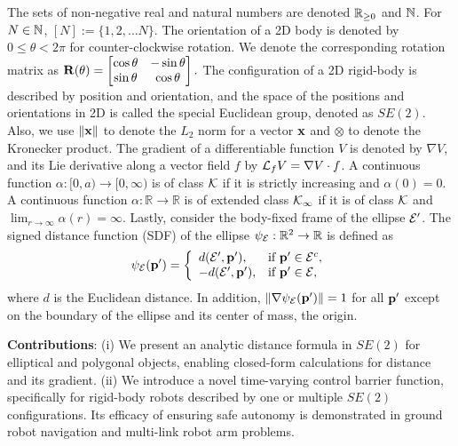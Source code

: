 The sets of non-negative real and natural numbers are denoted $\mathbb{R}_{\geq 0}$ and $\mathbb{N}$. For $N \in \mathbb{N}$, $[N] := \{1,2, \dots N\}$. The orientation of a 2D body is denoted by $0 \leq \theta < 2\pi$ for counter-clockwise rotation. We denote the corresponding rotation matrix as 
    $\mathbf{R}(\theta) = \begin{bmatrix} \cos \theta & -\sin \theta \\ \sin \theta & \cos \theta \end{bmatrix}.$
The configuration of a 2D rigid-body is described by position and orientation, and the space of the positions and orientations in 2D is called the special Euclidean group, denoted as $SE(2)$. Also, we use $\|\mathbf{x}\|$ to denote the $L_2$ norm for a vector $\mathbf{x}$ and $\otimes$ to denote the Kronecker product. The gradient of a differentiable function $V$ is denoted by $\nabla V$, and its Lie derivative along a vector field $f$ by ${\cal L}_f V  = \nabla V \cdot f$. A continuous function $\alpha: [0,a)\rightarrow [0,\infty )$ is of class ${\cal K}$ if it is strictly increasing and $\alpha(0) = 0$. A continuous function $\alpha:\mathbb{R} \rightarrow \mathbb{R}$ is of extended class ${\cal K}_{\infty}$ if it is of class ${\cal K}$ and $\lim_{r \rightarrow \infty} \alpha(r) = \infty$. Lastly, consider the body-fixed frame of the ellipse ${\cal E}'$. The signed distance function (SDF) of the ellipse $\psi_{\cal E}: \mathbb{R}^2 \to \mathbb{R}$ is defined as 
\begin{equation}
    \psi_{\cal E}(\mathbf{p}') 
    = \left\{
    \begin{array}{ll}
        d({\cal E}',\mathbf{p}'), & \text{if } \mathbf{p}' \in {\cal E}^c,  \\
        -d({\cal E}',\mathbf{p}'), & \text{if } \mathbf{p}' \in {\cal E},
    \end{array} 
    \right. \notag
\end{equation}
where $d$ is the Euclidean distance. In addition, $\|\nabla \psi_{\cal E} (\mathbf{p}')\| = 1$ for all $\mathbf{p}'$ except on the boundary of the ellipse and its center of mass, the origin.


\textbf{Contributions}: (i) We present an analytic distance formula in $SE(2)$ for elliptical and polygonal objects, enabling closed-form calculations for distance and its gradient. (ii) We introduce a novel time-varying control barrier function, specifically for rigid-body robots described by one or multiple $SE(2)$ configurations. Its efficacy of ensuring safe autonomy is demonstrated in ground robot navigation and multi-link robot arm problems. 


